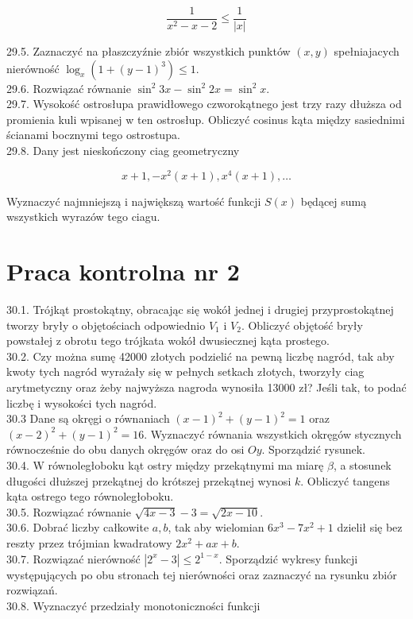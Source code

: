 \documentclass[10pt]{article}
\begin{document}
$$
\frac{1}{x^{2}-x-2} \leq \frac{1}{|x|}
$$

29.5. Zaznaczyć na płaszczyźnie zbiór wszystkich punktów $(x, y)$ spełniajacych nierówność $\log _{x}\left(1+(y-1)^{3}\right) \leq 1$.\\
29.6. Rozwiązać równanie $\sin ^{2} 3 x-\sin ^{2} 2 x=\sin ^{2} x$.\\
29.7. Wysokość ostrosłupa prawidłowego czworokątnego jest trzy razy dłuższa od promienia kuli wpisanej w ten ostrosłup. Obliczyć cosinus kąta między sasiednimi ścianami bocznymi tego ostrostupa.\\
29.8. Dany jest nieskończony ciag geometryczny

$$
x+1,-x^{2}(x+1), x^{4}(x+1), \ldots
$$

Wyznaczyć najmniejszą i największą wartość funkcji $S(x)$ będącej sumą wszystkich wyrazów tego ciagu.

\section*{Praca kontrolna nr 2}
30.1. Trójkąt prostokątny, obracając się wokół jednej i drugiej przyprostokątnej tworzy bryły o objętościach odpowiednio $V_{1}$ i $V_{2}$. Obliczyć objętość bryły powstałej z obrotu tego trójkata wokół dwusiecznej kąta prostego.\\
30.2. Czy można sumę 42000 złotych podzielić na pewną liczbę nagród, tak aby kwoty tych nagród wyrażały się w pełnych setkach złotych, tworzyły ciag arytmetyczny oraz żeby najwyższa nagroda wynosiła 13000 zł? Jeśli tak, to podać liczbę i wysokości tych nagród.\\
30.3 Dane są okręgi o równaniach $(x-1)^{2}+(y-1)^{2}=1$ oraz $(x-2)^{2}+(y-1)^{2}=16$. Wyznaczyć równania wszystkich okręgów stycznych równocześnie do obu danych okręgów oraz do osi $O y$. Sporządzić rysunek.\\
30.4. W równoległoboku kąt ostry między przekątnymi ma miarę $\beta$, a stosunek długości dłuższej przekątnej do krótszej przekątnej wynosi $k$. Obliczyć tangens kąta ostrego tego równoległoboku.\\
30.5. Rozwiązać równanie $\sqrt{4 x-3}-3=\sqrt{2 x-10}$.\\
30.6. Dobrać liczby całkowite $a, b$, tak aby wielomian $6 x^{3}-7 x^{2}+1$ dzielił się bez reszty przez trójmian kwadratowy $2 x^{2}+a x+b$.\\
30.7. Rozwiązać nierówność $\left|2^{x}-3\right| \leq 2^{1-x}$. Sporządzić wykresy funkcji występujących po obu stronach tej nierówności oraz zaznaczyć na rysunku zbiór rozwiązań.\\
30.8. Wyznaczyć przedziały monotoniczności funkcji
\end{document}
